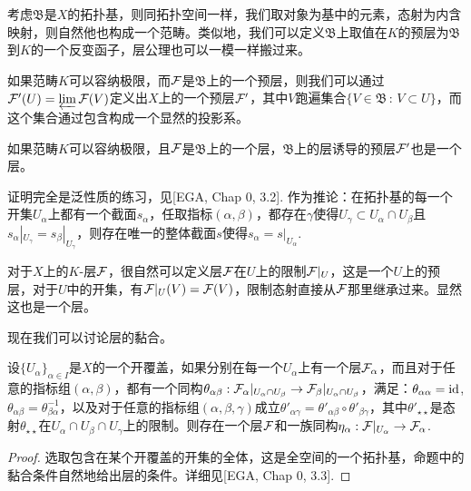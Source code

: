 \begin{para}
考虑$\mathfrak{B}$是$X$的拓扑基，则同拓扑空间一样，我们取对象为基中的元素，态射为内含映射，则自然他也构成一个范畴。类似地，我们可以定义$\mathfrak{B}$上取值在$K$的预层为$\mathfrak{B}$到$K$的一个反变函子，层公理也可以一模一样搬过来。

如果范畴$K$可以容纳极限，而$\mathcal{F}$是$\mathfrak{B}$上的一个预层，则我们可以通过$\mathcal{F}'(U)=\varprojlim \mathcal{F}(V)$定义出$X$上的一个预层$\mathcal{F}'$，其中$V$跑遍集合$\{V\in \mathfrak{B}\,:\, V\subset U\}$，而这个集合通过包含构成一个显然的投影系。
\end{para}

\begin{pro}\label{psgl}
如果范畴$K$可以容纳极限，且$\mathcal{F}$是$\mathfrak{B}$上的一个层，$\mathfrak{B}$上的层诱导的预层$\mathcal{F}'$也是一个层。
\end{pro}

证明完全是泛性质的练习，见[EGA, Chap 0, 3.2]. 作为推论：在拓扑基的每一个开集$U_\alpha$上都有一个截面$s_\alpha$，任取指标$(\alpha,\beta)$，都存在$\gamma$使得$U_\gamma\subset U_\alpha\cap U_\beta$且$s_\alpha|_{U_\gamma}=s_\beta|_{U_\gamma}$，则存在唯一的整体截面$s$使得$s_\alpha=s|_{U_\alpha}$.

\begin{para}
对于$X$上的$K$-层$\mathcal{F}$，很自然可以定义层$\mathcal{F}$在$U$上的限制$\mathcal{F}|_U$，这是一个$U$上的预层，对于$U$中的开集，有$\mathcal{F}|_U(V)=\mathcal{F}(V)$，限制态射直接从$\mathcal{F}$那里继承过来。显然这也是一个层。
\end{para}

现在我们可以讨论层的黏合。

\begin{pro}
设$\{U_\alpha\}_{\alpha \in I}$是$X$的一个开覆盖，如果分别在每一个$U_\alpha$上有一个层$\mathcal{F}_\alpha$，而且对于任意的指标组$(\alpha,\beta)$，都有一个同构$\theta_{\alpha\beta}:\mathcal{F}_\alpha|_{U_\alpha\cap U_\beta}\to \mathcal{F}_\beta|_{U_\alpha\cap U_\beta}$，满足：$\theta_{\alpha\alpha}=\operatorname{id}$, $\theta_{\alpha\beta}=\theta_{\beta\alpha}^{-1}$，以及对于任意的指标组$(\alpha,\beta,\gamma)$成立$\theta'_{\alpha\gamma}=\theta'_{\alpha\beta}\circ \theta'_{\beta\gamma}$，其中$\theta'_{\star\star}$是态射$\theta_{\star\star}$在$U_\alpha\cap U_\beta \cap U_\gamma$上的限制。则存在一个层$\mathcal{F}$和一族同构$\eta_\alpha:\mathcal{F}|_{U_\alpha}\to \mathcal{F}_\alpha$.
\end{pro}

\begin{proof}
选取包含在某个开覆盖的开集的全体，这是全空间的一个拓扑基，命题中的黏合条件自然地给出层的条件。详细见[EGA, Chap 0, 3.3].
\end{proof}

